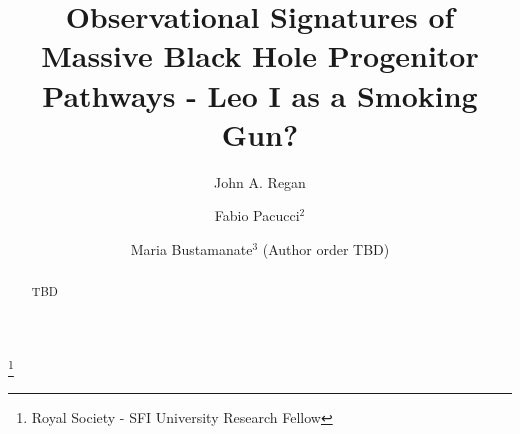 \documentclass[twocolumn, tighten]{aastex631}
\begin{document}
\title[Leo I a fossil galaxy]{Observational Signatures of Massive Black Hole Progenitor Pathways - Leo I as a Smoking Gun?}

\author[0000-0001-9072-6427]{John A. Regan}
\thanks{Royal Society - SFI University Research Fellow}

\author{Fabio Pacucci$^{2}$}
\author{Maria Bustamanate$^{3}$ (Author order TBD)}





\begin{abstract}
 TBD 
\end{abstract}

\end{document}
